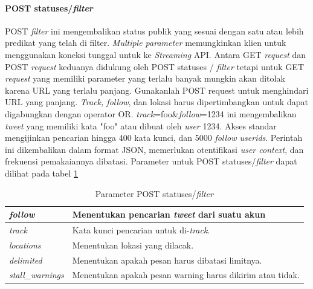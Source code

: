 \paragraph{POST statuses/\textit{filter}}
POST \textit{filter} ini mengembalikan status publik yang sesuai dengan satu atau lebih predikat yang telah di filter. \textit{Multiple parameter} memungkinkan klien untuk menggunakan koneksi tunggal untuk ke \textit{Streaming} API. Antara GET \textit{request} dan POST \textit{request} keduanya didukung oleh POST statuses / \textit{filter} tetapi untuk GET \textit{request} yang memiliki parameter yang terlalu banyak mungkin akan ditolak karena URL yang terlalu panjang. Gunakanlah POST request untuk menghindari URL yang panjang.
\textit{Track, follow}, dan lokasi harus dipertimbangkan untuk dapat digabungkan dengan operator OR. \textit{track}=foo\&\textit{follow}=1234 ini mengembalikan \textit{tweet} yang memiliki kata "foo" atau dibuat oleh \textit{user} 1234.
Akses standar mengijinkan pencarian hingga 400 kata kunci, dan 5000 \textit{follow userids}. Perintah ini dikembalikan dalam format JSON, memerlukan otentifikasi \textit{user context}, dan frekuensi pemakaiannya dibatasi. Parameter untuk POST statuses/\textit{filter} dapat dilihat pada tabel \ref{table:ParameterPostStatusesFilter}



\begin{table}[h]
\begin{tabular}{|p{3cm}|p{11cm}|}
\hline
\textit{follow}          & Menentukan pencarian \textit{tweet} dari suatu akun \\ \hline
\textit{track}           & Kata kunci pencarian untuk di-\textit{track}.              \\ \hline
\textit{locations}       & Menentukan lokasi yang dilacak.                                                    \\ \hline
\textit{delimited}       & Menentukan apakah pesan harus dibatasi limitnya.                                         \\ \hline
\textit{stall\_warnings} & Menentukan apakah pesan warning harus dikirim atau tidak. \\ \hline                                        
\end{tabular}
\caption{Parameter POST statuses/\textit{filter}}
\label{table:ParameterPostStatusesFilter}
\end{table}


